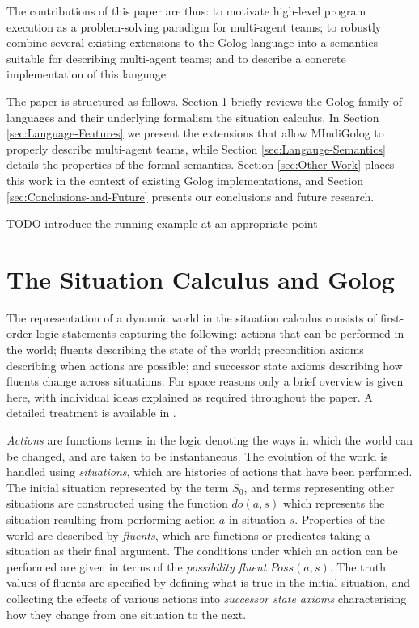 \documentclass[letterpaper]{article}
\begin{document}
The contributions of this paper are thus: to motivate high-level program
execution as a problem-solving paradigm for multi-agent teams; to
robustly combine several existing extensions to the Golog language
into a semantics suitable for describing multi-agent teams; and to
describe a concrete implementation of this language.

The paper is structured as follows. Section \ref{sec:SC-Golog}
briefly reviews the Golog family of languages
and their underlying formalism the situation calculus. In Section
\ref{sec:Language-Features} we present the extensions that allow
MIndiGolog to properly describe multi-agent teams, while Section \ref{sec:Langauge-Semantics}
details the properties of the formal semantics.
Section \ref{sec:Other-Work} places
this work in the context of existing Golog implementations, and Section
\ref{sec:Conclusions-and-Future} presents our conclusions and future
research. 

TODO introduce the running example at an appropriate point


\section{The Situation Calculus and Golog}

\label{sec:SC-Golog}

The representation of a dynamic world in the situation calculus consists
of first-order logic statements capturing the following: actions that
can be performed in the world; fluents describing the state of the
world; precondition axioms describing when actions are possible; and
successor state axioms describing how fluents change across situations.
For space reasons only a brief overview is given here, with individual
ideas explained as required throughout the paper. A detailed treatment
is available in \cite{pirri99contributions_sitcalc}.

\emph{Actions} are functions terms in the logic denoting the ways
in which the world can be changed, and are taken to be instantaneous.
The evolution of the world is handled using \emph{situations}, which
are histories of actions that have been performed. The initial situation
represented by the term $S_{0}$, and terms representing other situations
are constructed using the function $do(a,s)$ which represents the
situation resulting from performing action $a$ in situation $s$.
Properties of the world are described by \emph{fluents}, which are
functions or predicates taking a situation as their final argument.
The conditions under which an action can be performed are given in
terms of the \emph{possibility fluent} $Poss(a,s)$. The truth values
of fluents are specified by defining what is true in the initial situation,
and collecting the effects of various actions into \emph{successor
state axioms} characterising how they change from one situation to
the next.
\end{document}
